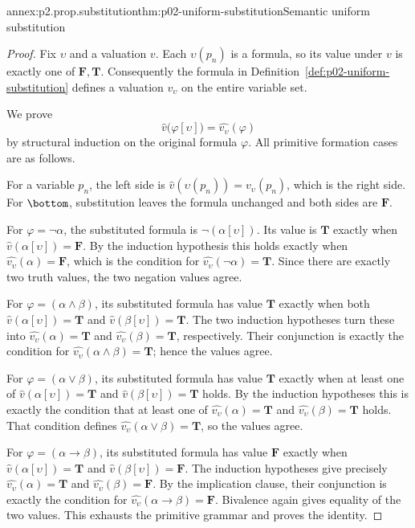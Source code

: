 \begin{annexitem}{annex:p2.prop.substitution}{thm:p02-uniform-substitution}{Semantic uniform substitution}
\begin{proof}
Fix \(\upsilon\) and a valuation \(v\).  Each \(\upsilon(p_n)\) is a formula,
so its value under \(v\) is exactly one of \(\mathbf F,\mathbf T\).
Consequently the formula in
Definition~\ref{def:p02-uniform-substitution} defines a valuation
\(v_\upsilon\) on the entire variable set.

We prove
\[
 \widehat v\bigl(\varphi[\upsilon]\bigr)
    =\widehat{v_\upsilon}(\varphi)
\]
by structural induction on the original formula \(\varphi\).
All primitive formation cases are as follows.

For a variable \(p_n\), the left side is
\(\widehat v(\upsilon(p_n))=v_\upsilon(p_n)\), which is the right side.
For \(\bottom\), substitution leaves the formula unchanged and both sides
are \(\mathbf F\).

For \(\varphi=\neg\alpha\), the substituted formula is
\(\neg(\alpha[\upsilon])\).  Its value is \(\mathbf T\) exactly when
\(\widehat v(\alpha[\upsilon])=\mathbf F\).
By the induction hypothesis this holds exactly when
\(\widehat{v_\upsilon}(\alpha)=\mathbf F\), which is the condition for
\(\widehat{v_\upsilon}(\neg\alpha)=\mathbf T\).
Since there are exactly two truth values, the two negation values agree.

For \(\varphi=(\alpha\land\beta)\), its substituted formula has value
\(\mathbf T\) exactly when both
\(\widehat v(\alpha[\upsilon])=\mathbf T\) and
\(\widehat v(\beta[\upsilon])=\mathbf T\).
The two induction hypotheses turn these into
\(\widehat{v_\upsilon}(\alpha)=\mathbf T\) and
\(\widehat{v_\upsilon}(\beta)=\mathbf T\), respectively.
Their conjunction is exactly the condition for
\(\widehat{v_\upsilon}(\alpha\land\beta)=\mathbf T\); hence the values agree.

For \(\varphi=(\alpha\lor\beta)\), its substituted formula has value
\(\mathbf T\) exactly when at least one of
\(\widehat v(\alpha[\upsilon])=\mathbf T\) and
\(\widehat v(\beta[\upsilon])=\mathbf T\) holds.
By the induction hypotheses this is exactly the condition that at least one of
\(\widehat{v_\upsilon}(\alpha)=\mathbf T\) and
\(\widehat{v_\upsilon}(\beta)=\mathbf T\) holds.
That condition defines
\(\widehat{v_\upsilon}(\alpha\lor\beta)=\mathbf T\), so the values agree.

For \(\varphi=(\alpha\to\beta)\), its substituted formula has value
\(\mathbf F\) exactly when
\(\widehat v(\alpha[\upsilon])=\mathbf T\) and
\(\widehat v(\beta[\upsilon])=\mathbf F\).
The induction hypotheses give precisely
\(\widehat{v_\upsilon}(\alpha)=\mathbf T\) and
\(\widehat{v_\upsilon}(\beta)=\mathbf F\).
By the implication clause, their conjunction is exactly the condition for
\(\widehat{v_\upsilon}(\alpha\to\beta)=\mathbf F\).
Bivalence again gives equality of the two values.  This exhausts the primitive
grammar and proves the identity.


\end{proof}
\end{annexitem}
